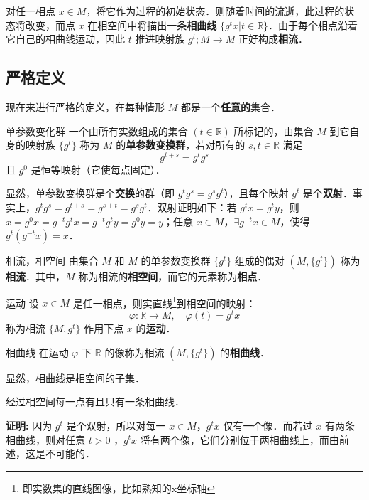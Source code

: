 对任一相点 $x\in M$，将它作为过程的初始状态．则随着时间的流逝，此过程的状态将改变，而点 $x$ 在相空间中将描出一条\textbf{相曲线} $\{g^tx|t\in \mathbb R\}$．由于每个相点沿着它自己的相曲线运动，因此 $t$ 推进映射族 $g^t;M\rightarrow M$ 正好构成\textbf{相流}． 
\subsection{严格定义}
现在来进行严格的定义，在每种情形 $M$ 都是一个\textbf{任意的}集合．
\begin{definition}{单参数变化群}
一个由所有实数组成的集合 $(t\in \mathbb R)$ 所标记的，由集合 $M$ 到它自身的映射族 $\{g^t\}$ 称为 $M$ 的\textbf{单参数变换群}，若对所有的 $s,t\in\mathbb R$ 满足
\begin{equation}
g^{t+s}=g^tg^s
\end{equation}
 且 $g^0$ 是恒等映射（它使每点固定）．
\end{definition}
显然，单参数变换群是个\textbf{交换}的群（即 $g^tg^s=g^sg^t$），且每个映射 $g^t$ 是个\textbf{双射}．事实上，$g^tg^s=g^{t+s}=g^{s+t}=g^sg^t$．双射证明如下：若 $g^t x=g^t y$，则 $x=g^0x=g^{-t}g^tx=g^{-t}g^ty=g^0y=y$；任意 $x\in M$，$\exists g^{-t}x\in M$，使得 $g^t(g^{-t}x)=x$．
\begin{definition}{相流，相空间}
由集合 $M$ 和 $M$ 的单参数变换群 $\{g^t\}$ 组成的偶对 $(M,\{g^t\})$ 称为\textbf{相流}．其中，$M$ 称为相流的\textbf{相空间}，而它的元素称为\textbf{相点}．
\end{definition}
\begin{definition}{运动}
设 $x\in M$ 是任一相点，则实直线\footnote{即实数集的直线图像，比如熟知的x坐标轴}到相空间的映射：
\begin{equation}\label{PSaPF_eq1}
\varphi:\mathbb R\rightarrow M,\quad \varphi(t)=g^tx
\end{equation}
称为相流 $\{M,{g^t}\}$ 作用下点 $x$ 的\textbf{运动}．
\end{definition}
\begin{definition}{相曲线}
在运动 $\varphi$ 下 $\mathbb R$ 的像称为相流 $(M,\{g^t\})$ 的\textbf{相曲线}．
\end{definition}
显然，相曲线是相空间的子集．
\begin{theorem}{}\label{PSaPF_the1}
经过相空间每一点有且只有一条相曲线．
\end{theorem}
\textbf{证明:}
因为 $g^t$ 是个双射，所以对每一 $x\in M$，$g^t x$ 仅有一个像．而若过 $x$ 有两条相曲线，则对任意 $t>0$ ，$g^tx$ 将有两个像，它们分别位于两相曲线上，而由前述，这是不可能的．

